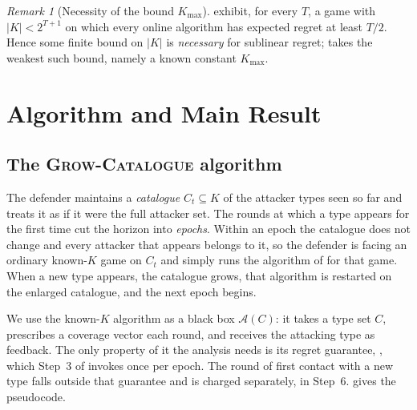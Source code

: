 \documentclass[letterpaper,9pt,twocolumn]{extarticle}
\newcommand{\Kmax}{K_{\max}}
\theoremstyle{plain}
\theoremstyle{definition}
\theoremstyle{remark}
\newtheorem{remark}[theorem]{Remark}
\begin{document}
\begin{remark}[Necessity of the bound $\Kmax$]\label{rem:necessity}
\citet[Theorem 7.1]{balcan2015} exhibit, for every $T$, a game with
$|K|<2^{T+1}$ on which every online algorithm has expected regret at
least $T/2$. Hence some finite bound on $|K|$ is \emph{necessary} for
sublinear regret;  takes the weakest such bound,
namely a known constant $\Kmax$.
\end{remark}



\section{Algorithm and Main Result}
\label{sec:alg}

\subsection{The \textsc{Grow-Catalogue} algorithm}

The defender maintains a \emph{catalogue} $C_t\subseteq K$ of the attacker
types seen so far and treats it as if it were the full attacker set. The
rounds at which a type appears for the first time cut the horizon into
\emph{epochs}. Within an epoch the catalogue does not change and every
attacker that appears belongs to it, so the defender is facing an ordinary
known-$K$ game on $C_t$ and simply runs the algorithm of
\citet[Sec.~5]{balcan2015} for that game. When a new type appears, the
catalogue grows, that algorithm is restarted on the enlarged catalogue, and
the next epoch begins.

We use the known-$K$ algorithm as a black box $\mathcal{A}(C)$: it takes a
type set $C$, prescribes a coverage vector each round, and receives the
attacking type as feedback. The only property of it the analysis needs is
its regret guarantee, \citet[Theorem 5.1]{balcan2015}, which Step~3 of
 invokes once per epoch. The round of first contact with a
new type falls outside that guarantee and is charged separately, in Step~6.
 gives the pseudocode.
\end{document}

